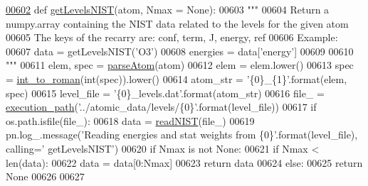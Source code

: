 \begin{DoxyCode}
\hypertarget{namespacepyneb_1_1utils_1_1manage__atomic__data_l00602}{}\hyperlink{namespacepyneb_1_1utils_1_1manage__atomic__data_ad09376e8676854d44680ae14210b5589}{00602} \textcolor{keyword}{def }\hyperlink{namespacepyneb_1_1utils_1_1manage__atomic__data_ad09376e8676854d44680ae14210b5589}{getLevelsNIST}(atom, Nmax = None):
00603     \textcolor{stringliteral}{"""}
00604 \textcolor{stringliteral}{    Return a numpy.array containing the NIST data related to the levels for the given atom}
00605 \textcolor{stringliteral}{    The keys of the recarry are: conf, term, J, energy, ref}
00606 \textcolor{stringliteral}{    Example:}
00607 \textcolor{stringliteral}{        data = getLevelsNIST('O3')}
00608 \textcolor{stringliteral}{        energies = data['energy']}
00609 \textcolor{stringliteral}{        }
00610 \textcolor{stringliteral}{    """}
00611     elem, spec = \hyperlink{namespacepyneb_1_1utils_1_1misc_a8c069186002a3e73dd474958e35034d5}{parseAtom}(atom)
00612     elem = elem.lower()
00613     spec = \hyperlink{namespacepyneb_1_1utils_1_1misc_aec4e973d4cb9299f749ef190ea636a06}{int\_to\_roman}(int(spec)).lower()
00614     atom\_str = \textcolor{stringliteral}{'\{0\}\_\{1\}'}.format(elem, spec)
00615     level\_file = \textcolor{stringliteral}{'\{0\}\_levels.dat'}.format(atom\_str)
00616     file\_ = \hyperlink{namespacepyneb_1_1utils_1_1misc_a0e9572755930aabb03c6b0e5d66b8356}{execution\_path}(\textcolor{stringliteral}{'../atomic\_data/levels/\{0\}'}.format(level\_file))
00617     \textcolor{keywordflow}{if} os.path.isfile(file\_):
00618         data = \hyperlink{namespacepyneb_1_1utils_1_1manage__atomic__data_ab843a6f51ebb888e83a849835e49a885}{readNIST}(file\_)
00619         pn.log\_.message(\textcolor{stringliteral}{'Reading energies and stat weights from \{0\}'}.format(level\_file), calling=\textcolor{stringliteral}{'
      getLevelsNIST'})
00620         \textcolor{keywordflow}{if} Nmax \textcolor{keywordflow}{is} \textcolor{keywordflow}{not} \textcolor{keywordtype}{None}:
00621             \textcolor{keywordflow}{if} Nmax < len(data):
00622                 data = data[0:Nmax]
00623         \textcolor{keywordflow}{return} data
00624     \textcolor{keywordflow}{else}:
00625         \textcolor{keywordflow}{return} \textcolor{keywordtype}{None}
00626     
00627     
\end{DoxyCode}
\hypertarget{namespacepyneb_1_1utils_1_1manage__atomic__data_ab843a6f51ebb888e83a849835e49a885}{}
